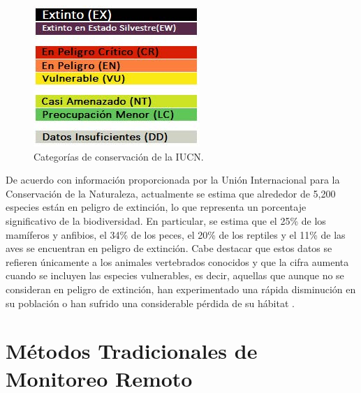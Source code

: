 \begin{figure}[h]
    \centering
    \includegraphics[width=0.4\linewidth]{imagenes/img9_categorias_iucn.jpg}
    \caption{Categorías de conservación de la IUCN.}
    \label{fig:enter-label}
\end{figure}

\noindent De acuerdo con información proporcionada por la Unión Internacional para la Conservación de la Naturaleza, actualmente se estima que alrededor de 5,200 especies están en peligro de extinción, lo que representa un porcentaje significativo de la biodiversidad. En particular, se estima que el 25\% de los mamíferos y anfibios, el 34\% de los peces, el 20\% de los reptiles y el 11\% de las aves se encuentran en peligro de extinción. Cabe destacar que estos datos se refieren únicamente a los animales vertebrados conocidos y que la cifra aumenta cuando se incluyen las especies vulnerables, es decir, aquellas que aunque no se consideran en peligro de extinción, han experimentado una rápida disminución en su población o han sufrido una considerable pérdida de su hábitat \cite{45}.

\section{Métodos Tradicionales de Monitoreo Remoto}

